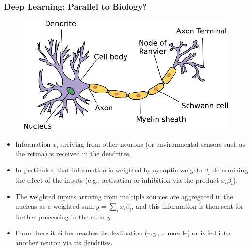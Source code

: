\documentclass[
  shownotes,
  xcolor={svgnames},
  hyperref={colorlinks,citecolor=DarkBlue,linkcolor=DarkRed,urlcolor=DarkBlue}
  , aspectratio=169]{beamer}
\begin{document}
\begin{frame}
\frametitle{Deep Learning: Parallel to Biology?}


  \begin{figure}[H] \centering
            \captionsetup{justification=centering}
              \includegraphics[scale=0.4]{figures/neuron.pdf}
              
 \end{figure}


\begin{itemize}
  \footnotesize
  \item Information $x_i$ arriving from other neurons (or environmental sensors such as the retina) is received in the dendrites. 
\item In particular, that information is weighted by synaptic weights $\beta_i$ determining the effect of the inputs (e.g., activation or inhibition via the product $x_i \beta_i$). 
\item The weighted inputs arriving from multiple sources are aggregated in the nucleus as a weighted sum $y=\sum_i x_i\beta_i$, and this information is then sent for further processing in the axon $y$

\item  From there it either reaches its destination (e.g., a muscle) or is fed into another neuron via its dendrites.


\end{itemize}


\end{frame}
\end{document}
